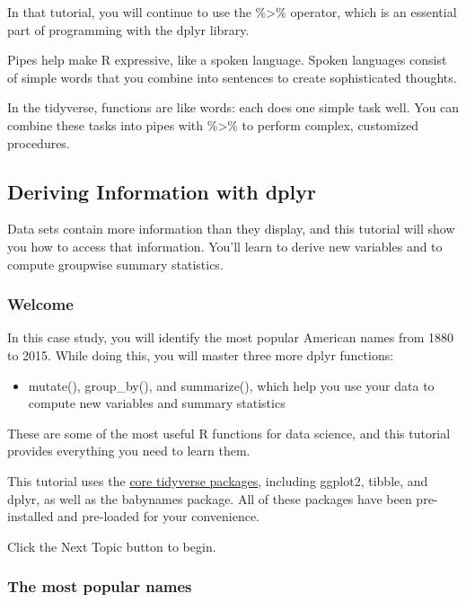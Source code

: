 \documentclass[
]{article}
\providecommand{\tightlist}{%
  \setlength{\itemsep}{0pt}\setlength{\parskip}{0pt}}
\begin{document}
In that tutorial, you will continue to use the \%\textgreater\%
operator, which is an essential part of programming with the dplyr
library.

Pipes help make R expressive, like a spoken language. Spoken languages
consist of simple words that you combine into sentences to create
sophisticated thoughts.

In the tidyverse, functions are like words: each does one simple task
well. You can combine these tasks into pipes with \%\textgreater\% to
perform complex, customized procedures.

\hypertarget{deriving-information-with-dplyr}{%
\subsection{Deriving Information with
dplyr}\label{deriving-information-with-dplyr}}

Data sets contain more information than they display, and this tutorial
will show you how to access that information. You'll learn to derive new
variables and to compute groupwise summary statistics.

\hypertarget{welcome-4}{%
\subsubsection{Welcome}\label{welcome-4}}

In this case study, you will identify the most popular American names
from 1880 to 2015. While doing this, you will master three more dplyr
functions:

\begin{itemize}
\tightlist
\item
  mutate(), group\_by(), and summarize(), which help you use your data
  to compute new variables and summary statistics
\end{itemize}

These are some of the most useful R functions for data science, and this
tutorial provides everything you need to learn them.

This tutorial uses the \href{http://tidyverse.org/}{core tidyverse
packages}, including ggplot2, tibble, and dplyr, as well as the
babynames package. All of these packages have been pre-installed and
pre-loaded for your convenience.

Click the Next Topic button to begin.

\hypertarget{the-most-popular-names}{%
\subsubsection{The most popular names}\label{the-most-popular-names}}
\end{document}
